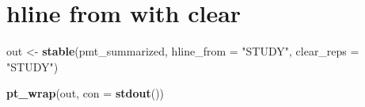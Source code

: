 \documentclass[
]{article}
\newenvironment{Shaded}{\begin{snugshade}}{\end{snugshade}}
\newcommand{\ControlFlowTok}[1]{\textcolor[rgb]{0.13,0.29,0.53}{\textbf{#1}}}
\newcommand{\DataTypeTok}[1]{\textcolor[rgb]{0.13,0.29,0.53}{#1}}
\newcommand{\KeywordTok}[1]{\textcolor[rgb]{0.13,0.29,0.53}{\textbf{#1}}}
\newcommand{\NormalTok}[1]{#1}
\newcommand{\OperatorTok}[1]{\textcolor[rgb]{0.81,0.36,0.00}{\textbf{#1}}}
\newcommand{\StringTok}[1]{\textcolor[rgb]{0.31,0.60,0.02}{#1}}
\begin{document}
\begin{Shaded}
\end{Shaded}

\clearpage

\hypertarget{hline-from-with-clear}{%
\section{hline from with clear}\label{hline-from-with-clear}}

\begin{Shaded}
\begin{Highlighting}[]
\NormalTok{out <-}\StringTok{ }\KeywordTok{stable}\NormalTok{(pmt_summarized, }\DataTypeTok{hline_from =} \StringTok{"STUDY"}\NormalTok{, }\DataTypeTok{clear_reps =} \StringTok{"STUDY"}\NormalTok{)}

\KeywordTok{pt_wrap}\NormalTok{(out, }\DataTypeTok{con =} \KeywordTok{stdout}\NormalTok{()) }
\end{Highlighting}
\end{Shaded}
\end{document}
